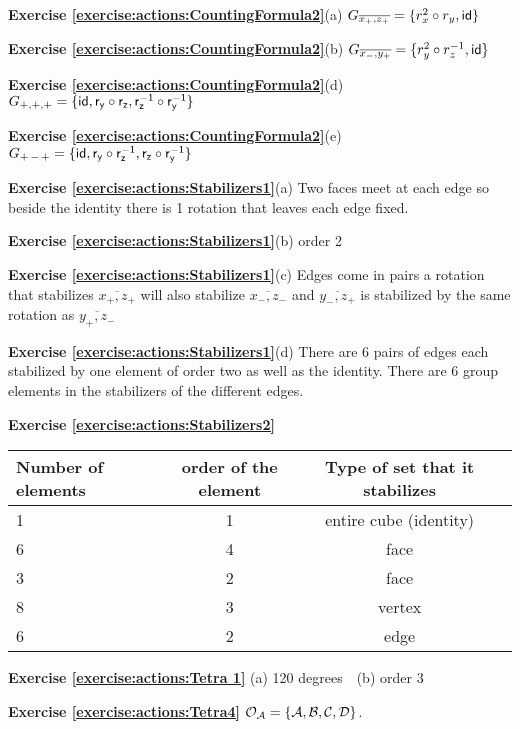 \noindent\textbf{Exercise \ref{exercise:actions:CountingFormula2}}(a)
$G_{\overline{x_+,z_+}}=\{r_x^2\circ r_y, \sf{id}\}$

\noindent\textbf{Exercise \ref{exercise:actions:CountingFormula2}}(b)
$G_{\overline{x_-,y_+}}=\{r_y^2\circ r_z^{-1}, \sf{id}\}$

\noindent\textbf{Exercise \ref{exercise:actions:CountingFormula2}}(d)
 $G_{+,+,+}=\{\sf{id}, r_y\circ r_z, r_z^{-1}\circ r_y^{-1} \}$

\noindent\textbf{Exercise \ref{exercise:actions:CountingFormula2}}(e)
$G_{+\,-\,+}=\{\sf{id}, r_y\circ r_z^{-1}, r_z\circ r_y^{-1} \}$

\noindent\textbf{Exercise \ref{exercise:actions:Stabilizers1}}(a)
Two faces meet at each edge so beside the identity there is 1 rotation that leaves each edge fixed.  

\noindent\textbf{Exercise \ref{exercise:actions:Stabilizers1}}(b)
order 2 

\noindent\textbf{Exercise \ref{exercise:actions:Stabilizers1}}(c)
Edges come in pairs a rotation that stabilizes $\overline{x_+,z_+}$ will also stabilize $\overline{x_-,z_-}$ and $\overline{y_-,z_+}$ is stabilized by the same rotation as $\overline{y_+,z_-}$

\noindent\textbf{Exercise \ref{exercise:actions:Stabilizers1}}(d)
There are 6 pairs of edges each stabilized by one element of order two as well as the identity.  There are 6 group elements in the stabilizers of the different edges.

\noindent\textbf{Exercise \ref{exercise:actions:Stabilizers2}}

\begin{center}
\begin{tabular}{ |l |c|c| r |}\hline
  Number of elements & order of the element & Type of set that it stabilizes \\ \hline
  1 & 1 & entire cube (identity) \\ \hline
  6 & 4 & face \\ \hline
 3 & 2 & face \\ \hline
8 & 3& vertex \\ \hline
6& 2 & edge \\ \hline
\end{tabular}
\end{center}

\noindent\textbf{Exercise \ref{exercise:actions:Tetra 1}}
(a)  120 degrees~~(b)  order 3

\noindent\textbf{Exercise \ref{exercise:actions:Tetra4}}
$ \cal{O}_A =\{A,B,C,D\}$.

